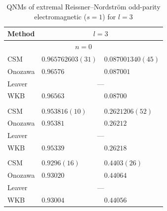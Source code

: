 \begin{table}[htbp]
\centering
\caption{QNMs of extremal Reissner--Nordstr\"om odd-parity electromagnetic ($s=1$) for $l=3$}
\label{src:2604_20442:tab:result_rn1_2}
\begin{tabular}{l
                l@{$-\rmi$}l}
\toprule
Method & \multicolumn{2}{c}{$l=3$} \\
\midrule
\multicolumn{3}{c}{$n=0$} \\
CSM     & $0.965762603(31)$ & $0.087001340(45)$ \\
Onozawa & $0.96576$     & $0.087001$ \\
Leaver  & \multicolumn{2}{c}{---} \\
WKB     & $0.96563$     & $0.08700$ \\
\addlinespace
\multicolumn{3}{c}{$n=1$} \\
CSM     & $0.953816(10)$ & $0.2621206(52)$ \\
Onozawa & $0.95381$   & $0.26212$ \\
Leaver  & \multicolumn{2}{c}{---} \\
WKB     & $0.95339$   & $0.26218$ \\
\addlinespace
\multicolumn{3}{c}{$n=2$} \\
CSM     & $0.9296(16)$ & $0.4403(26)$ \\
Onozawa & $0.93020$    & $0.44064$ \\
Leaver  & \multicolumn{2}{c}{---} \\
WKB     & $0.93004$    & $0.44056$ \\
\bottomrule
\end{tabular}
\end{table}

